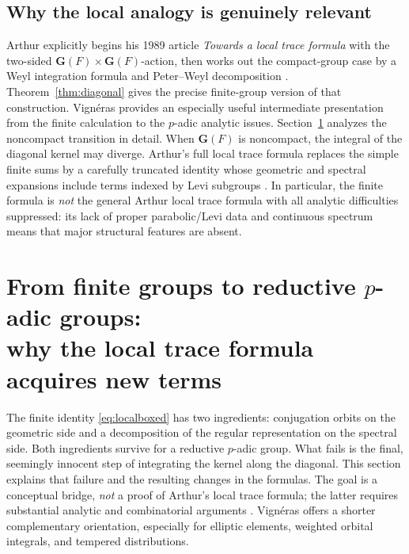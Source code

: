 \documentclass[12pt]{article}
\theoremstyle{remark}
\begin{document}
\subsection{Why the local analogy is genuinely relevant}
Arthur explicitly begins his 1989 article \emph{Towards a local trace
formula} with the two-sided $\mathbf G(F)\times\mathbf G(F)$-action,
then works out the compact-group case by a Weyl integration formula
and Peter--Weyl decomposition \cite[\S\S1--2]{ArthurTowards1989}.
Theorem~\ref{thm:diagonal} gives the precise finite-group version
of that construction. Vign\'eras \cite[\S\S1--2]{Vigneras1991}
provides an especially useful intermediate presentation from the
finite calculation to the $p$-adic analytic issues.
Section~\ref{sec:padic-bridge} analyzes
the noncompact transition in detail. When $\mathbf G(F)$ is noncompact, the
integral of the diagonal kernel may diverge. Arthur's full local trace
formula replaces the simple finite sums by a carefully truncated
identity whose geometric and spectral expansions include terms
indexed by Levi subgroups \cite{ArthurLocal1991}.
In particular, the finite formula is \emph{not} the general
Arthur local trace formula with all analytic difficulties suppressed:
its lack of proper parabolic/Levi data and continuous spectrum means
that major structural features are absent.


\section{From finite groups to reductive $p$-adic groups:\\
why the local trace formula acquires new terms}
\label{sec:padic-bridge}
The finite identity \eqref{eq:localboxed} has two ingredients:
conjugation orbits on the geometric side and a decomposition of the
regular representation on the spectral side. Both ingredients survive
for a reductive $p$-adic group.  What fails is the final, seemingly
innocent step of integrating the kernel along the diagonal.  This
section explains that failure and the resulting changes in the
formulas. The goal is a conceptual bridge, \emph{not} a proof of
Arthur's local trace formula; the latter requires substantial analytic
and combinatorial arguments \cite{ArthurTowards1989,ArthurLocal1991}.
Vign\'eras \cite[\S2]{Vigneras1991} offers a shorter
complementary orientation, especially for elliptic elements,
weighted orbital integrals, and tempered distributions.
\end{document}
